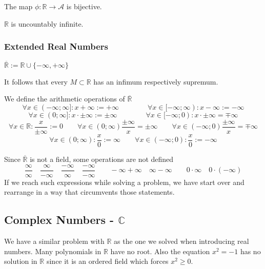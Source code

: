 \begin{theorem}\label{thm:decimal_map}
   The map \(\phi: \mathbb{R} \to \mathcal{A}\) is bijective.
\end{theorem}

\begin{proposition}[\(\abs{\mathbb{R}} = \infty\)]\label{pro:R_uncountable}
   \(\mathbb{R}\) is uncountably infinite.
\end{proposition}

\subsubsection{Extended Real Numbers}
\begin{definition}
   \(\overline{\mathbb{R}} := \mathbb{R} \cup \{-\infty, +\infty\}\)
\end{definition}
\begin{remark}
   It follows that every \(M \subset \mathbb{R}\) has an infimum respectively supremum.
\end{remark}

\begin{definition}
   We define the arithmetic operations of \(\overline{\mathbb{R}}\)
   \[\forall x \in (-\infty; \infty]: x + \infty := +\infty \qquad\qquad \forall x \in [-\infty; \infty): x - \infty := -\infty\]
   \[\forall x \in (0; \infty]: x \cdot \pm\infty := \pm\infty \qquad\qquad \forall x \in [-\infty; 0): x \cdot \pm\infty = \mp\infty\]
   \[\forall x \in \mathbb{R}: \frac{x}{\pm\infty} := 0 \qquad \forall x \in (0; \infty) \frac{\pm\infty}{x} = \pm\infty \qquad \forall x \in (-\infty; 0) \frac{\pm\infty}{x} = \mp\infty\]
   \[\forall x \in (0; \infty): \frac{x}{0} := \infty \qquad \forall x \in (-\infty; 0): \frac{x}{0} := -\infty\]
\end{definition}

\begin{remark}
   Since \(\overline{\mathbb{R}}\) is not a field, some operations are not defined
   \[\frac{\infty}{\infty} \quad \frac{\infty}{-\infty} \quad \frac{-\infty}{\infty} \quad \frac{-\infty}{-\infty} \qquad -\infty + \infty \quad \infty - \infty \qquad 0 \cdot \infty \quad 0 \cdot (-\infty)\]
   If we reach such expressions while solving a problem, we have start over and rearrange in a way that circumvents those statements.
\end{remark}

\subsection{Complex Numbers - \texorpdfstring{\(\mathbb{C}\)}{C}}
We have a similar problem with \(\mathbb{R}\) as the one we solved when introducing real numbers.
Many polynomials in \(\mathbb{R}\) have no root.
Also the equation \(x^2 = -1\) has no solution in \(\mathbb{R}\) since it is an ordered field which forces \(x^2 \geq 0\).

